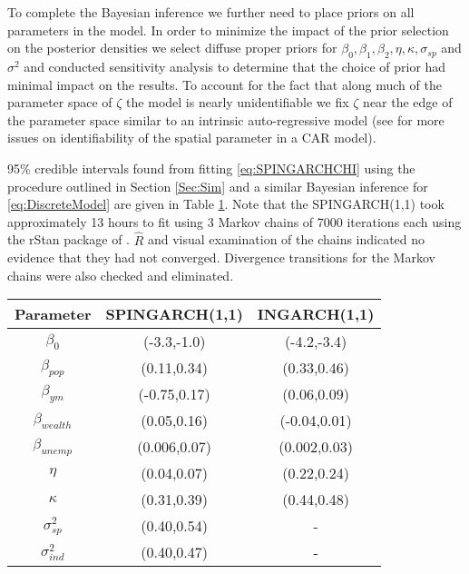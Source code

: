 \documentclass[11pt]{isuthesis}
\begin{document}
To complete the Bayesian inference we further need to place priors on all parameters in the model.  In order to minimize the impact of the prior selection on the posterior densities we select diffuse proper priors for $\beta_0,\beta_1,\beta_2,\eta,\kappa,\sigma_{sp}$ and $\sigma^2$ and conducted sensitivity analysis to determine that the choice of prior had minimal impact on the results. To account for the fact that along much of the parameter space of $\zeta$ the model is nearly unidentifiable we fix $\zeta$ near the edge of the parameter space similar to an intrinsic auto-regressive model (see \cite{wall2004close} for more issues on identifiability of the spatial parameter in a CAR model).

95\% credible intervals found from fitting \eqref{eq:SPINGARCHCHI} using the procedure outlined in Section \ref{Sec:Sim} and a similar Bayesian inference for \eqref{eq:DiscreteModel} are given in Table \ref{Table:ResultsChi}.  Note that the SPINGARCH(1,1) took approximately 13 hours to fit using 3 Markov chains of 7000 iterations each using the rStan package of \cite{carpenter2016stan}.  $\hat{R}$ and visual examination of the chains indicated no evidence that they had not converged.  Divergence transitions for the Markov chains were also checked and eliminated.


\begin{table}[!htp]
	\begin{center}
		\begin{tabular}{ |c|c|c| } 
			\hline
			Parameter & SPINGARCH(1,1) & INGARCH(1,1) \\
			\hline 
			$\beta_0$ & (-3.3,-1.0) & (-4.2,-3.4) \\
			$\beta_{pop}$ & (0.11,0.34) & (0.33,0.46)\\
			$\beta_{ym}$ & (-0.75,0.17)& (0.06,0.09)\\
			$\beta_{wealth}$&(0.05,0.16) & (-0.04,0.01)\\
			$\beta_{unemp}$ & (0.006,0.07)& (0.002,0.03) \\
			$\eta$ & (0.04,0.07) & (0.22,0.24)\\
			$\kappa$ & (0.31,0.39)& (0.44,0.48)\\
			$\sigma_{sp}^2$ & (0.40,0.54) & - \\
			$\sigma_{ind}^2$& (0.40,0.47)& - \\
			\hline
		\end{tabular}
	\end{center}
	\label{Table:ResultsChi}
\end{table}
\end{document}
